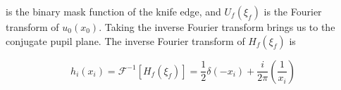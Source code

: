\noindent is the binary mask function of the knife edge, and $U_f(\xi_f)$ is the Fourier transform of $u_0(x_0)$. Taking the inverse Fourier transform brings us to the conjugate pupil plane. The inverse Fourier transform of $H_f(\xi_f)$ is


\begin{equation}
    h_i(x_i)= \mathcal{F}^{-1}[H_f(\xi_f)] =
    \frac{1}{2} \delta(-x_i) + \frac{i}{2\pi} \left(\frac{1}{x_i}\right)
\label{delta}
\end{equation}





    




